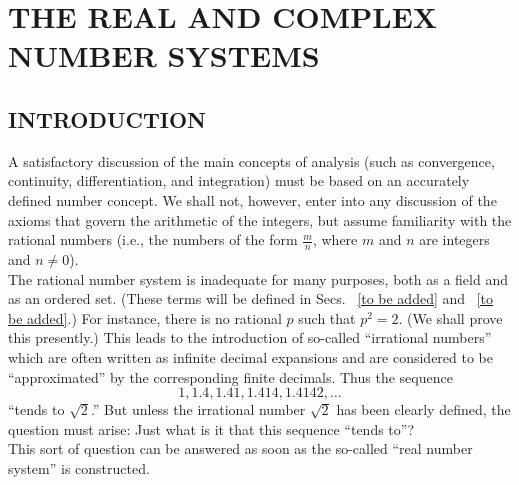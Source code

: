%
%
%
\chapter{THE REAL AND COMPLEX NUMBER SYSTEMS}
\label{intro} %


\section{\textbf{INTRODUCTION}}
A satisfactory discussion of the main concepts of analysis (such as convergence, continuity, differentiation, and integration) 
must be based on an accurately defined number concept. We shall not, however, enter into any discussion of 
the axioms that govern the arithmetic of the integers, but assume familiarity with the rational numbers 
(i.e., the numbers of the form $\frac{m}{n}$, where $m$ and $n$ are integers and $n\not=0$).\\
The rational number system is inadequate for many purposes, both as a field and as an ordered set. (These terms will 
be defined in Secs. ~\ref{to be added} and ~\ref{to be added}.) For instance, there is no rational $p$ such that 
$p^2=2$. (We shall prove this presently.) This leads to the introduction of so-called ``irrational numbers'' 
which are often written as infinite decimal expansions and are considered to be ``approximated'' by the corresponding 
finite decimals. Thus the sequence
\begin{equation*}
    1, 1.4, 1.41, 1.414, 1.4142, \dots
\end{equation*}
``tends to $\sqrt{2}$.'' But unless the irrational number $\sqrt{2}$ has been clearly defined, the question must arise: 
Just what is it that this sequence ``tends to''?\\
\indent This sort of question can be answered as soon as the so-called ``real number system'' is constructed.

